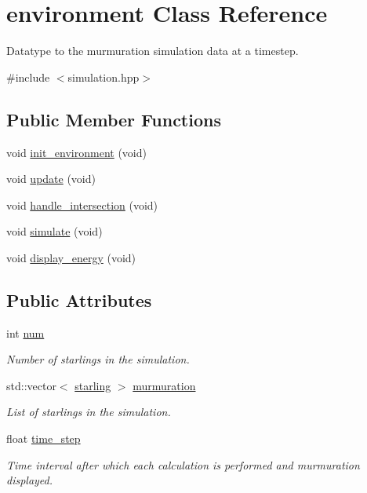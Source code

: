 \hypertarget{classenvironment}{}\section{environment Class Reference}
\label{classenvironment}


Datatype to the murmuration simulation data at a timestep.  




{\ttfamily \#include $<$simulation.\+hpp$>$}

\subsection*{Public Member Functions}
\begin{DoxyCompactItemize}
\item 
void \mbox{\hyperlink{classenvironment_ab70fa382f51a7e098e6093ed4643be28}{init\+\_\+environment}} (void)
\item 
void \mbox{\hyperlink{classenvironment_a0ccbf5c41be42b0d43a079517b2c7299}{update}} (void)
\item 
void \mbox{\hyperlink{classenvironment_ad393e034c116a501e4c39b66d8564087}{handle\+\_\+intersection}} (void)
\item 
void \mbox{\hyperlink{classenvironment_a60eddb68039d6c5f3b98e568e02346d7}{simulate}} (void)
\item 
void \mbox{\hyperlink{classenvironment_ad7c2f863d61f8188dffd3975111f4cb1}{display\+\_\+energy}} (void)
\end{DoxyCompactItemize}
\subsection*{Public Attributes}
\begin{DoxyCompactItemize}
\item 
int \mbox{\hyperlink{classenvironment_a0b681df3c52565e6ad6e42baea0c2be8}{num}}
\begin{DoxyCompactList}\small\item\em Number of starlings in the simulation. \end{DoxyCompactList}\item 
std\+::vector$<$ \mbox{\hyperlink{classstarling}{starling}} $>$ \mbox{\hyperlink{classenvironment_a47dbbdcd0b1eb003df03062c5923e8d3}{murmuration}}
\begin{DoxyCompactList}\small\item\em List of starlings in the simulation. \end{DoxyCompactList}\item 
float \mbox{\hyperlink{classenvironment_af0b9e5c67270c8bc45113bd033f3703d}{time\+\_\+step}}
\begin{DoxyCompactList}\small\item\em Time interval after which each calculation is performed and murmuration displayed. \end{DoxyCompactList}\end{DoxyCompactItemize}


